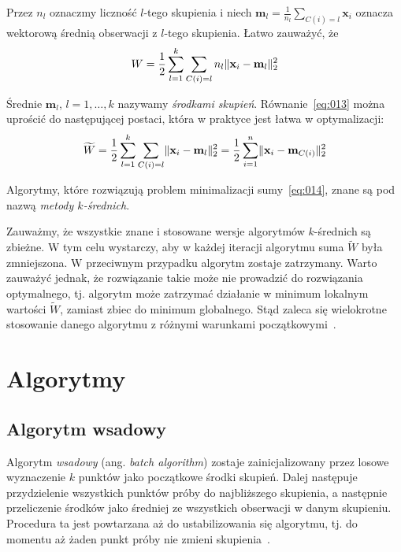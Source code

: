 \documentclass{praca1}
\DeclarePairedDelimiter{\norm}{\lVert}{\rVert}
\begin{document}
Przez $n_l$ oznaczmy liczność $l$-tego skupienia i niech $\mathbf{m}_l = \frac{1}{n_l} \sum\limits_{C(i) = l} \mathbf{x}_i$ oznacza wektorową średnią obserwacji z $l$-tego skupienia. Łatwo zauważyć, że~\cite{Koronacki2005:statystyczne}
\begin{equation}
\label{eq:013}
W = \frac{1}{2}\sum\limits_{l=1}^{k}\sum\limits_{C(i) = l} n_l \norm{\mathbf{x}_i - \mathbf{m}_l}_2^2
\end{equation}

Średnie $\mathbf{m}_l$, $l = 1,\ldots, k$ nazywamy \emph{środkami skupień}. Równanie~\ref{eq:013} można uprościć do następującej postaci, która w praktyce jest łatwa w optymalizacji:
\begin{equation}
\label{eq:014}
\widetilde{W} = \frac{1}{2}\sum\limits_{l=1}^{k}\sum\limits_{C(i) = l} \norm{\mathbf{x}_i - \mathbf{m}_l}_2^2 = \frac{1}{2}\sum\limits_{i=1}^{n} \norm{\mathbf{x}_i - \mathbf{m}_{C(i)}}_2^2 
\end{equation}

Algorytmy, które rozwiązują problem minimalizacji sumy~\ref{eq:014}, znane są pod nazwą \emph{metody $k$-średnich}.

Zauważmy, że wszystkie znane i stosowane wersje algorytmów $k$-średnich są zbieżne. W tym celu wystarczy, aby w każdej iteracji algorytmu suma $\widetilde{W}$ była zmniejszona. W przeciwnym przypadku algorytm zostaje zatrzymany. Warto zauważyć jednak, że rozwiązanie takie może nie prowadzić do rozwiązania optymalnego, tj. algorytm może zatrzymać działanie w minimum lokalnym wartości $\widetilde{W}$, zamiast zbiec do minimum globalnego. Stąd zaleca się wielokrotne stosowanie danego algorytmu z różnymi warunkami początkowymi~\cite{Koronacki2005:statystyczne}.

\section{Algorytmy}

\subsection{Algorytm wsadowy}


Algorytm \emph{wsadowy} (ang. \emph{batch algorithm}) zostaje zainicjalizowany przez losowe wyznaczenie $k$ punktów jako początkowe środki skupień. Dalej następuje przydzielenie wszystkich punktów próby do najbliższego skupienia, a następnie przeliczenie środków jako średniej ze wszystkich obserwacji w danym skupieniu. Procedura ta jest powtarzana aż do ustabilizowania się algorytmu, tj. do momentu aż żaden punkt próby nie zmieni skupienia~\cite{Wu2007:topten}.
\end{document}
